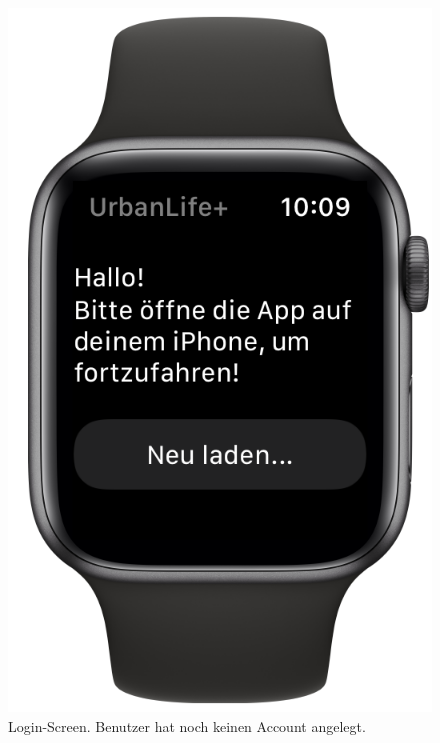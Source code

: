 \begin{minipage}{.45\textwidth}
	\begin{figure}[H]
		\centering
		\includegraphics[width=.68\textwidth]{./images/prototype/watchos/loginNoAccount.png}
		\caption{\label{fig:app:watchos:loginNoAccount}Login-Screen. Benutzer hat noch keinen Account angelegt.}
	\end{figure}
\end{minipage}\hfill
